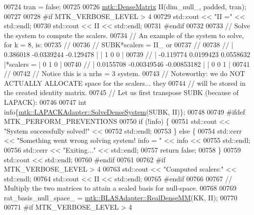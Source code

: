 \begin{DoxyCode}
{{00724   tran = \textcolor{keyword}{false};
00725 
00726   \hyperlink{classmtk_1_1DenseMatrix}{mtk::DenseMatrix} II(dim\_null\_, padded, tran);
00727 
00728 \textcolor{preprocessor}{  #if MTK\_VERBOSE\_LEVEL > 4}
00729   std::cout << \textcolor{stringliteral}{"II ="} << std::endl;
00730   std::cout << II << std::endl;
00731 \textcolor{preprocessor}{  #endif}
00732 
00733   \textcolor{comment}{// Solve the system to compute the scalers.}
00734   \textcolor{comment}{// An example of the system to solve, for k = 8, is:}
00735   \textcolor{comment}{//}
00736   \textcolor{comment}{// SUBK*scalers = II\_ or}
00737   \textcolor{comment}{//}
00738   \textcolor{comment}{// |  0.386018  -0.0339244   -0.129478 |           | 1 0 0 |}
00739   \textcolor{comment}{// | -0.119774   0.0199423   0.0558632 |*scalers = | 0 1 0 |}
00740   \textcolor{comment}{// | 0.0155708 -0.00349546 -0.00853182 |           | 0 0 1 |}
00741   \textcolor{comment}{//}
00742   \textcolor{comment}{// Notice this is a nrhs = 3 system.}
00743   \textcolor{comment}{// Noteworthy: we do NOT ACTUALLY ALLOCATE space for the scalers... they}
00744   \textcolor{comment}{// will be stored in the created identity matrix.}
00745   \textcolor{comment}{// Let us first transpose SUBK (because of LAPACK):}
00746 
00747   \textcolor{keywordtype}{int} info\{\hyperlink{classmtk_1_1LAPACKAdapter_a7428bccf74fd4a4af68fb7233846da22}{mtk::LAPACKAdapter::SolveDenseSystem}(SUBK, II)\};
00748 
00749 \textcolor{preprocessor}{  #ifdef MTK\_PERFORM\_PREVENTIONS}
00750   \textcolor{keywordflow}{if} (!info) \{
00751     std::cout << \textcolor{stringliteral}{"System successfully solved!"} <<
00752       std::endl;
00753   \} \textcolor{keywordflow}{else} \{
00754     std::cerr << \textcolor{stringliteral}{"Something went wrong solving system! info = "} << info <<
00755       std::endl;
00756     std::cerr << \textcolor{stringliteral}{"Exiting..."} << std::endl;
00757     \textcolor{keywordflow}{return} \textcolor{keyword}{false};
00758   \}
00759   std::cout << std::endl;
00760 \textcolor{preprocessor}{  #endif}
00761 
00762 \textcolor{preprocessor}{  #if MTK\_VERBOSE\_LEVEL > 4}
00763   std::cout << \textcolor{stringliteral}{"Computed scalers:"} << std::endl;
00764   std::cout << II << std::endl;
00765 \textcolor{preprocessor}{  #endif}
00766 
00767   \textcolor{comment}{// Multiply the two matrices to attain a scaled basis for null-space.}
00768 
00769   rat\_basis\_null\_space\_ = \hyperlink{classmtk_1_1BLASAdapter_acebd0e9bfe0bdd609c7fbea98ccfd3b5}{mtk::BLASAdapter::RealDenseMM}(KK, II);
00770 
00771 \textcolor{preprocessor}{  #if MTK\_VERBOSE\_LEVEL > 4}
}}
\end{DoxyCode}
